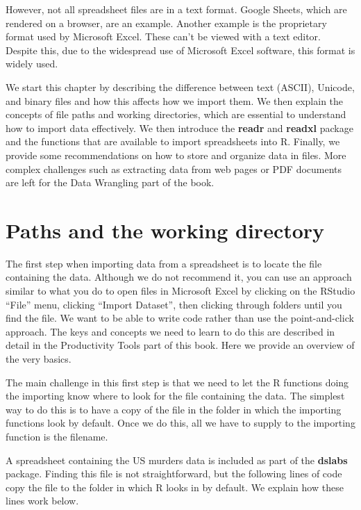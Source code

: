 \documentclass[
]{krantz}
\begin{document}
However, not all spreadsheet files are in a text format. Google Sheets, which are rendered on a browser, are an example. Another example is the proprietary format used by Microsoft Excel. These can't be viewed with a text editor. Despite this, due to the widespread use of Microsoft Excel software, this format is widely used.

We start this chapter by describing the difference between text (ASCII), Unicode, and binary files and how this affects how we import them. We then explain the concepts of file paths and working directories, which are essential to understand how to import data effectively. We then introduce the \textbf{readr} and \textbf{readxl} package and the functions that are available to import spreadsheets into R. Finally, we provide some recommendations on how to store and organize data in files. More complex challenges such as extracting data from web pages or PDF documents are left for the Data Wrangling part of the book.

\hypertarget{paths-and-the-working-directory}{%
\section{Paths and the working directory}\label{paths-and-the-working-directory}}

The first step when importing data from a spreadsheet is to locate the file containing the data. Although we do not recommend it, you can use an approach similar to what you do to open files in Microsoft Excel by clicking on the RStudio ``File'' menu, clicking ``Import Dataset'', then clicking through folders until you find the file. We want to be able to write code rather than use the point-and-click approach. The keys and concepts we need to learn to do this are described in detail in the Productivity Tools part of this book. Here we provide an overview of the very basics.

The main challenge in this first step is that we need to let the R functions doing the importing know where to look for the file containing the data. The simplest way to do this is to have a copy of the file in the folder in which the importing functions look by default. Once we do this, all we have to supply to the importing function is the filename.

A spreadsheet containing the US murders data is included as part of the \textbf{dslabs} package. Finding this file is not straightforward, but the following lines of code copy the file to the folder in which R looks in by default. We explain how these lines work below.
\end{document}
